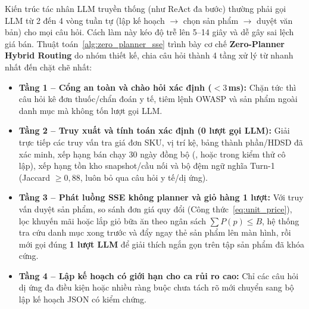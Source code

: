 Kiến trúc tác nhân LLM truyền thống (như ReAct đa bước) thường phải gọi LLM từ 2 đến 4 vòng tuần tự (lập kế hoạch $\to$ chọn sản phẩm $\to$ duyệt văn bản) cho mọi câu hỏi. Cách làm này kéo độ trễ lên 5--14 giây và dễ gây sai lệch giá bán. Thuật toán~\ref{alg:zero_planner_sse} trình bày cơ chế \textbf{Zero-Planner Hybrid Routing} do nhóm thiết kế, chia câu hỏi thành 4 tầng xử lý từ nhanh nhất đến chặt chẽ nhất:
\begin{itemize}
    \item \textbf{Tầng 1 -- Cổng an toàn và chào hỏi xác định ($<3$\,ms):} Chặn tức thì câu hỏi kê đơn thuốc/chẩn đoán y tế, tiêm lệnh OWASP và sản phẩm ngoài danh mục mà không tốn lượt gọi LLM.
    \item \textbf{Tầng 2 -- Truy xuất và tính toán xác định (0 lượt gọi LLM):} Giải trực tiếp các truy vấn tra giá đơn SKU, vị trí kệ, bảng thành phần/HDSD đã xác minh, xếp hạng bán chạy 30 ngày đồng bộ (, hoặc  trong kiểm thử cô lập), xếp hạng tồn kho snapshot/cầu nối và bộ đệm ngữ nghĩa Turn-1 (Jaccard $\ge 0{,}88$, luôn bỏ qua câu hỏi y tế/dị ứng).
    \item \textbf{Tầng 3 -- Phát luồng SSE không planner và giỏ hàng 1 lượt:} Với truy vấn duyệt sản phẩm, so sánh đơn giá quy đổi (Công thức~\ref{eq:unit_price}), lọc khuyến mãi hoặc lắp giỏ bữa ăn theo ngân sách $\sum P(p) \le B$, hệ thống tra cứu danh mục xong trước và đẩy ngay thẻ sản phẩm lên màn hình, rồi mới gọi đúng \textbf{1 lượt LLM} để giải thích ngắn gọn trên tập sản phẩm đã khóa cứng.
    \item \textbf{Tầng 4 -- Lập kế hoạch có giới hạn cho ca rủi ro cao:} Chỉ các câu hỏi dị ứng đa điều kiện hoặc nhiều ràng buộc chưa tách rõ mới chuyển sang bộ lập kế hoạch JSON có kiểm chứng.
\end{itemize}


